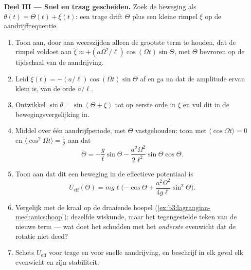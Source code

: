 \begin{problem}
\medskip\noindent\textbf{Deel III --- Snel en traag gescheiden.}
Zoek de beweging als $\theta(t) = \Theta(t) + \xi(t)$: een trage drift
$\Theta$ plus een kleine rimpel $\xi$ op de aandrijffrequentie.
\begin{enumerate}[resume]
  \item Toon aan, door aan weerszijden alleen de grootste term te
        houden, dat de rimpel voldoet aan
        $\ddot\xi \approx +(a\Omega^2/\ell)\cos(\Omega t)
        \sin\Theta$, met $\Theta$
        bevroren op de tijdschaal van de aandrijving.
  \item Leid $\xi(t) = -(a/\ell)\cos(\Omega t)\sin\Theta$ af en ga na
        dat de amplitude ervan klein is, van de orde $a/\ell$.
  \item Ontwikkel $\sin\theta = \sin(\Theta + \xi)$ tot op eerste orde in
        $\xi$ en vul dit in de bewegingsvergelijking in.
  \item Middel over één aandrijfperiode, met $\Theta$ vastgehouden: toon
        met $\langle\cos\Omega t\rangle = 0$ en
        $\langle\cos^2\Omega t\rangle = \tfrac12$ aan dat
        \[
        \ddot\Theta = -\frac{g}{\ell}\sin\Theta
         - \frac{a^2\Omega^2}{2\ell^2}\sin\Theta\cos\Theta .
        \]
  \item Toon aan dat dit een beweging in de effectieve potentiaal is
        \[
        U_{\text{eff}}(\Theta) = mg\ell\Big({-\cos\Theta}
         + \frac{a^2\Omega^2}{4g\ell}\sin^2\Theta\Big) .
        \]
  \item Vergelijk met de kraal op de draaiende hoepel
        (\cref{ex:b3:lagrangian-mechanics:hoop}): dezelfde wiskunde,
        maar het tegengestelde teken van de nieuwe term --- wat doet het
        schudden met het \emph{onderste} evenwicht dat de rotatie niet
        deed?
  \item Schets $U_{\text{eff}}$ voor trage en voor snelle aandrijving, en
        beschrijf in elk geval elk evenwicht en zijn stabiliteit.
\end{enumerate}


\end{problem}
